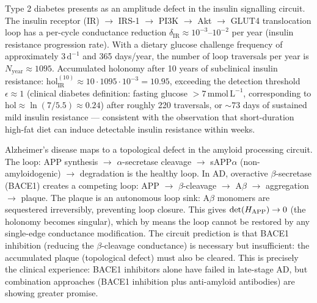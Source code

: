 \begin{example}
\label{ex:ch08-t2d}
Type 2 diabetes presents as an amplitude defect in the insulin signalling
circuit.  The insulin receptor (IR) $\to$ IRS-1 $\to$ PI3K $\to$ Akt
$\to$ GLUT4 translocation loop has a per-cycle conductance reduction
$\delta_{\mathrm{IR}} \approx 10^{-3}$--$10^{-2}$ per year (insulin
resistance progression rate).  With a dietary glucose challenge frequency
of approximately $3\,\mathrm{d}^{-1}$ and 365 days/year, the number of
loop traversals per year is $N_{\mathrm{year}} \approx 1095$.  Accumulated
holonomy after 10 years of subclinical insulin resistance:
$\mathrm{hol}_{\mathrm{IR}}^{(10)} \approx 10 \cdot 1095 \cdot 10^{-3}
= 10.95$,
exceeding the detection threshold $\epsilon \approx 1$ (clinical diabetes
definition: fasting glucose $> 7\,\mathrm{mmol\,L^{-1}}$, corresponding
to $\mathrm{hol} \approx \ln(7/5.5) \approx 0.24$) after roughly 220
traversals, or $\sim 73$ days of sustained mild insulin resistance ---
consistent with the observation that short-duration high-fat diet can
induce detectable insulin resistance within weeks.
\end{example}

\begin{example}
\label{ex:alzheimer}
Alzheimer's disease maps to a topological defect in the amyloid
processing circuit.  The loop: APP synthesis $\to$ $\alpha$-secretase
cleavage $\to$ sAPP$\alpha$ (non-amyloidogenic) $\to$ degradation is the
healthy loop.  In AD, overactive $\beta$-secretase (BACE1) creates a
competing loop: APP $\to$ $\beta$-cleavage $\to$ A$\beta$ $\to$
aggregation $\to$ plaque.  The plaque is an autonomous loop sink:
A$\beta$ monomers are sequestered irreversibly, preventing loop closure.
This gives $\det(H_{\mathrm{APP}}) \to 0$ (the holonomy becomes
singular), which by  means the loop cannot be
restored by any single-edge conductance modification.  The circuit
prediction is that BACE1 inhibition (reducing the $\beta$-cleavage
conductance) is necessary but insufficient: the accumulated plaque
(topological defect) must also be cleared.  This is precisely the
clinical experience: BACE1 inhibitors alone have failed in late-stage AD,
but combination approaches (BACE1 inhibition plus anti-amyloid antibodies)
are showing greater promise.
\end{example}


